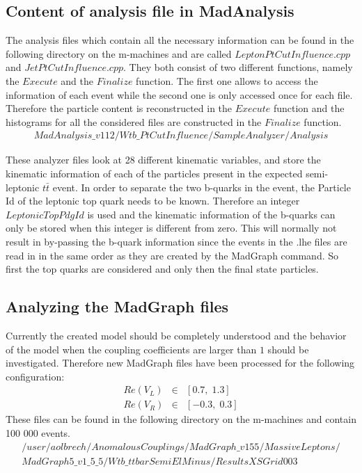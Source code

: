 \subsection{Content of analysis file in MadAnalysis}
The analysis files which contain all the necessary information can be found in the following directory on the m-machines and are called $LeptonPtCutInfluence.cpp$ and $JetPtCutInfluence.cpp$. They both consist of two different functions, namely the $Execute$ and the $Finalize$ function. The first one allows to access the information of each event while the second one is only accessed once for each file. Therefore the particle content is reconstructed in the $Execute$ function and the histograms for all the considered files are constructed in the $Finalize$ function.
\begin{eqnarray*}
  MadAnalysis\_v112/Wtb\_PtCutInfluence/SampleAnalyzer/Analysis \nonumber
\end{eqnarray*}

These analyzer files look at 28 different kinematic variables, and store the kinematic information of each of the particles present in the expected semi-leptonic $t\bar{t}$ event. 
In order to separate the two b-quarks in the event, the Particle Id of the leptonic top quark needs to be known. Therefore an integer $LeptonicTopPdgId$ is used and the kinematic information of the b-quarks can only be stored when this integer is different from zero.
This will normally not result in by-passing the b-quark information since the events in the .lhe files are read in in the same order as they are created by the MadGraph command. So first the top quarks are considered and only then the final state particles.

\subsection{Analyzing the MadGraph files}\label{subsec:MadGraphFiles}
Currently the created model should be completely understood and the behavior of the model when the coupling coefficients are larger than $1$ should be investigated. Therefore new MadGraph files have been processed for the following configuration:
\begin{eqnarray*}
  Re(V_L) & \in & \left[  0.7, \; 1.3\right] \\
  Re(V_R) & \in & \left[ -0.3, \; 0.3\right]
\end{eqnarray*}
These files can be found in the following directory on the m-machines and contain 100 000 events.
\begin{eqnarray*}
  /user/aolbrech/AnomalousCouplings/MadGraph\_v155/MassiveLeptons/\\ MadGraph5\_v1\_5\_5/Wtb\_ttbarSemiElMinus/ResultsXSGrid003
\end{eqnarray*}


